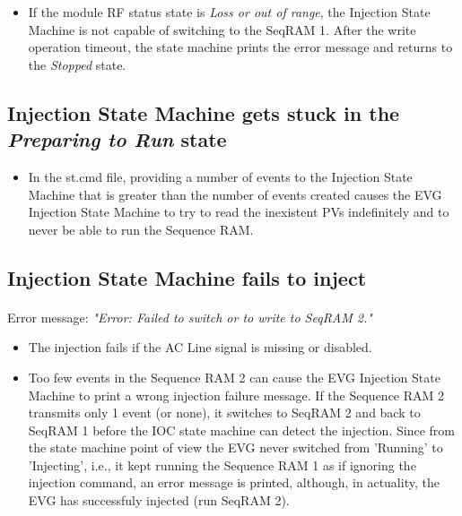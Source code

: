 \documentclass[openany]{article}
\begin{document}
		\begin{itemize}
		\item If the module RF status state is \emph{Loss or out of range}, the Injection State Machine is not capable of switching to the SeqRAM 1. After the write operation timeout, the state machine prints the error message and returns to the \emph{Stopped} state.
		\end{itemize}

	\subsection{Injection State Machine gets stuck in the \emph{Preparing to Run} state}

		\begin{itemize}
		\item In the st.cmd file, providing a number of events to the Injection State Machine that is greater than the number of events created causes the EVG Injection State Machine to try to read the inexistent PVs indefinitely and to never be able to run the Sequence RAM.
		\end{itemize}

	\subsection{Injection State Machine fails to inject}

		\paragraph{} Error message: \emph{"Error: Failed to switch or to write to SeqRAM 2."}

		\begin{itemize}
		\item The injection fails if the AC Line signal is missing or disabled.
		\item Too few events in the Sequence RAM 2 can cause the EVG Injection State Machine to print a wrong injection failure message. If the Sequence RAM 2 transmits only 1 event (or none), it switches to SeqRAM 2 and back to SeqRAM 1 before the IOC state machine can detect the injection. Since from the state machine point of view the EVG never switched from 'Running' to 'Injecting', i.e., it kept running the Sequence RAM 1 as if ignoring the injection command, an error message is printed, although, in actuality, the EVG has successfuly injected (run SeqRAM 2).
		\end{itemize}
\end{document}
